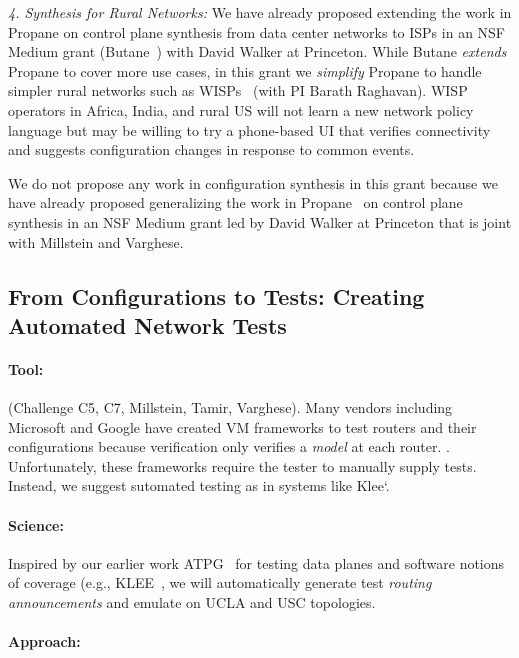 {\em 4. Synthesis for Rural Networks:}  We have already proposed extending the work in Propane on control plane synthesis from data center networks to ISPs in an NSF Medium grant (Butane~\cite{butane}) with David Walker at Princeton.  While Butane {\em extends} Propane to cover more use cases, in this grant we {\em simplify} Propane to handle simpler rural networks such as WISPs~\cite{barath} (with PI Barath Raghavan). WISP operators in Africa, India, and rural US will not learn a new network policy language but may be willing to try a phone-based UI that verifies connectivity and suggests configuration changes in response to common events.

We do not propose any work in configuration synthesis in this grant because we have already proposed generalizing the work in Propane~\cite{propane} on control plane synthesis in an NSF Medium grant led by David Walker at Princeton that is joint with Millstein and Varghese. 

\subsection{From Configurations to Tests: Creating Automated Network Tests}

\paragraph*{Tool:} (Challenge C5, C7, Millstein, Tamir, Varghese). Many vendors including Microsoft and 
Google have created VM frameworks to test routers and their configurations because verification only verifies a {\em  model} at  each router. .  Unfortunately, these frameworks require
the tester to manually supply tests.  Instead, we suggest sutomated testing as in systems like Klee`\cite{klee}.

\paragraph*{Science:}  Inspired  by our earlier work ATPG~\cite{atpg} for testing data planes and software notions of coverage (e.g., KLEE~\cite{klee}, we will automatically generate test {\em routing announcements} and emulate on UCLA and USC topologies.

\paragraph*{Approach:}

